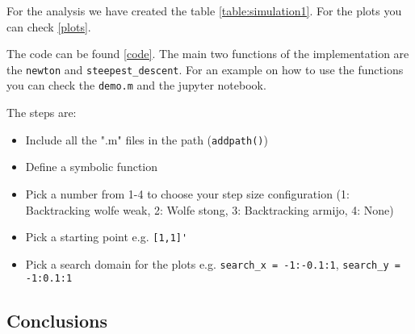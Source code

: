 \documentclass[a4paper,11pt]{article}
\numberwithin{equation}{section} %
\begin{document}
For the analysis we have created the table \ref{table:simulation1}. For the plots you can check \ref{plots}.

The code can be found \ref{code}.
The main two functions of the implementation are the \verb|newton| and \verb|steepest_descent|. For an example on how to use the functions you can check the \verb|demo.m| and the jupyter notebook.

The steps are:
\begin{itemize}
    \item Include all the ".m" files in the path (\verb|addpath()|)
    \item Define a symbolic function
    \item Pick a number from 1-4 to choose your step size configuration (1: Backtracking wolfe weak, 2: Wolfe stong, 3: Backtracking armijo, 4: None)
    \item Pick a starting point e.g. \verb|[1,1]'|
    \item Pick a search domain for the plots e.g. \verb|search_x = -1:-0.1:1|, \verb|search_y = -1:0.1:1|
\end{itemize}





\subsection{Conclusions}
\end{document}
